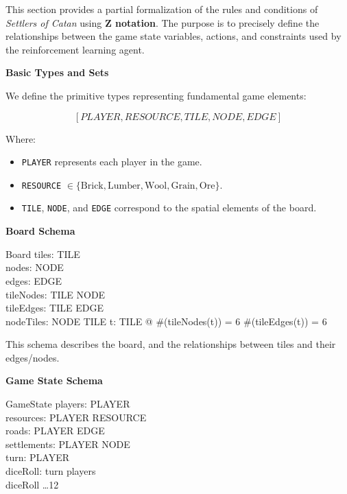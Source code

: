 \documentclass{article}
\begin{document}
This section provides a partial formalization of the rules and conditions of \textit{Settlers of Catan} using \textbf{Z notation}.
The purpose is to precisely define the relationships between the game state variables, actions, and constraints used by the reinforcement learning agent. \newline

\textbf{Basic Types and Sets}

We define the primitive types representing fundamental game elements:

\[
[PLAYER, RESOURCE, TILE, NODE, EDGE]
\]

Where:
\begin{itemize}
    \item \texttt{PLAYER} represents each player in the game.
    \item \texttt{RESOURCE} $\in \{\text{Brick}, \text{Lumber}, \text{Wool}, \text{Grain}, \text{Ore}\}$.
    \item \texttt{TILE}, \texttt{NODE}, and \texttt{EDGE} correspond to the spatial elements of the board. \newline
\end{itemize}

\textbf{Board Schema}

\begin{schema}{Board}
    tiles:  TILE \\
    nodes:  NODE \\
    edges:  EDGE \\
    tileNodes: TILE \fun {} NODE \\  %
    tileEdges: TILE \fun {} EDGE \\  %
    nodeTiles: NODE \fun {} TILE    %
\where
    \forall t: TILE @
        \#(tileNodes(t)) = 6 \land
        \#(tileEdges(t)) = 6
\end{schema}

This schema describes the board, and the relationships between tiles and their edges/nodes. \newline

\textbf{Game State Schema}

\begin{schema}{GameState}
    players:  PLAYER \\
    resources: PLAYER \fun RESOURCE \pfun {} \\
    roads: PLAYER \fun {} EDGE \\
    settlements: PLAYER \fun {} NODE \\
    turn: PLAYER \\
    diceRoll: 
    \where
    turn \in players \\
    diceRoll  \dots 12
\end{schema}
\end{document}

